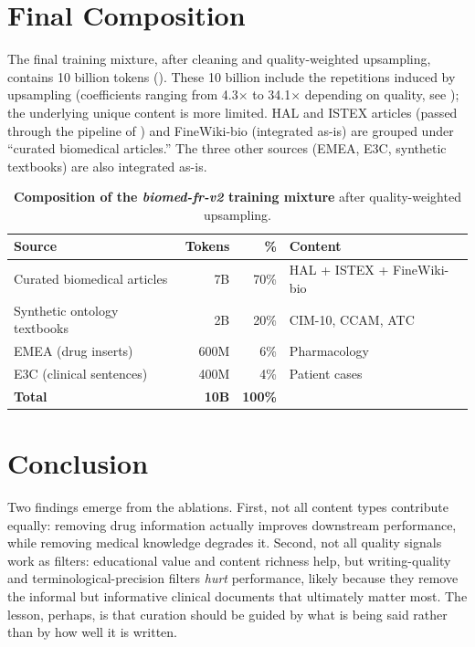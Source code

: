 \section{Final Composition}

\begin{reviewread}
The final training mixture, after cleaning and quality-weighted upsampling, contains 10 billion tokens (). These 10 billion include the repetitions induced by upsampling (coefficients ranging from 4.3$\times$ to 34.1$\times$ depending on quality, see ); the underlying unique content is more limited. HAL and ISTEX articles (passed through the pipeline of ) and FineWiki-bio (integrated as-is) are grouped under ``curated biomedical articles.'' The three other sources (EMEA, E3C, synthetic textbooks) are also integrated as-is.
\end{reviewread}

\begin{table}[t]
\centering
\small
\setlength{\tabcolsep}{10pt}
\begin{tabular}{lrrl}
\toprule
\textbf{Source} & \textbf{Tokens} & \textbf{\%} & \textbf{Content} \\
\midrule
Curated biomedical articles & 7B & 70\% & HAL + ISTEX + FineWiki-bio \\
Synthetic ontology textbooks & 2B & 20\% & CIM-10, CCAM, ATC \\
EMEA (drug inserts) & 600M & 6\% & Pharmacology \\
E3C (clinical sentences) & 400M & 4\% & Patient cases \\
\midrule
\textbf{Total} & \textbf{10B} & \textbf{100\%} & \\
\bottomrule
\end{tabular}
\caption{\textbf{Composition of the \textit{biomed-fr-v2} training mixture} after quality-weighted upsampling.}
\label{tab:mcbio-corpus}
\end{table}


\section*{Conclusion}

\begin{reviewread}
Two findings emerge from the ablations. First, not all content types contribute equally: removing drug information actually improves downstream performance, while removing medical knowledge degrades it. Second, not all quality signals work as filters: educational value and content richness help, but writing-quality and terminological-precision filters \emph{hurt} performance, likely because they remove the informal but informative clinical documents that ultimately matter most. The lesson, perhaps, is that curation should be guided by what is being said rather than by how well it is written.
\end{reviewread}

